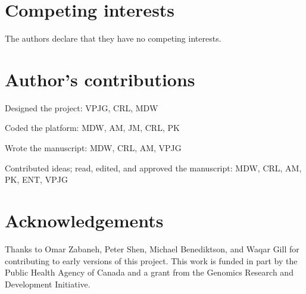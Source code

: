 \documentclass[doublespacing, linenumbers]{bmcart}
\begin{document}

\begin{backmatter}

\section*{Competing interests}
  The authors declare that they have no competing interests.

\section*{Author's contributions}
Designed the project: VPJG, CRL, MDW

Coded the platform: MDW, AM, JM, CRL, PK

Wrote the manuscript: MDW, CRL, AM, VPJG

Contributed ideas; read, edited, and approved the manuscript: MDW, CRL, AM, PK, ENT, VPJG

\section*{Acknowledgements}
Thanks to Omar Zabaneh, Peter Shen, Michael Benediktson, and Waqar Gill for contributing to early versions of this project.  This work is funded in part by the Public Health Agency of Canada and a grant from the Genomics Research and Development Initiative.



\end{backmatter}
\end{document}

